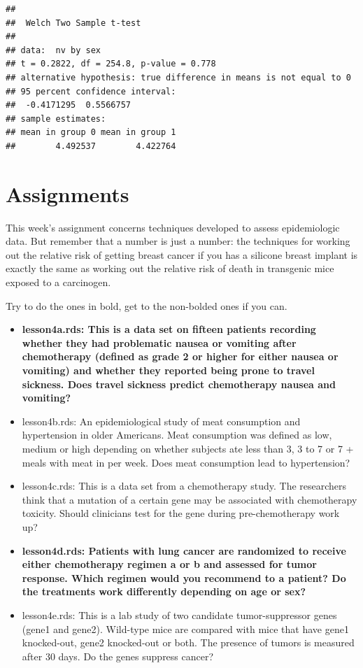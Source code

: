 \documentclass[]{book}
\providecommand{\tightlist}{%
  \setlength{\itemsep}{0pt}\setlength{\parskip}{0pt}}
\begin{document}
\begin{verbatim}
## 
##  Welch Two Sample t-test
## 
## data:  nv by sex
## t = 0.2822, df = 254.8, p-value = 0.778
## alternative hypothesis: true difference in means is not equal to 0
## 95 percent confidence interval:
##  -0.4171295  0.5566757
## sample estimates:
## mean in group 0 mean in group 1 
##        4.492537        4.422764
\end{verbatim}

\hypertarget{assignments-3}{%
\section{Assignments}\label{assignments-3}}

This week's assignment concerns techniques developed to assess epidemiologic data. But remember that a number is just a number: the techniques for working out the relative risk of getting breast cancer if you has a silicone breast implant is exactly the same as working out the relative risk of death in transgenic mice exposed to a carcinogen.

Try to do the ones in bold, get to the non-bolded ones if you can.

\begin{itemize}
\tightlist
\item
  \textbf{lesson4a.rds: This is a data set on fifteen patients recording whether they had problematic nausea or vomiting after chemotherapy (defined as grade 2 or higher for either nausea or vomiting) and whether they reported being prone to travel sickness. Does travel sickness predict chemotherapy nausea and vomiting?}
\item
  lesson4b.rds: An epidemiological study of meat consumption and hypertension in older Americans. Meat consumption was defined as low, medium or high depending on whether subjects ate less than 3, 3 to 7 or 7 + meals with meat in per week. Does meat consumption lead to hypertension?
\item
  lesson4c.rds: This is a data set from a chemotherapy study. The researchers think that a mutation of a certain gene may be associated with chemotherapy toxicity. Should clinicians test for the gene during pre-chemotherapy work up?
\item
  \textbf{lesson4d.rds: Patients with lung cancer are randomized to receive either chemotherapy regimen a or b and assessed for tumor response. Which regimen would you recommend to a patient? Do the treatments work differently depending on age or sex?}
\item
  lesson4e.rds: This is a lab study of two candidate tumor-suppressor genes (gene1 and gene2). Wild-type mice are compared with mice that have gene1 knocked-out, gene2 knocked-out or both. The presence of tumors is measured after 30 days. Do the genes suppress cancer?
\end{itemize}
\end{document}
